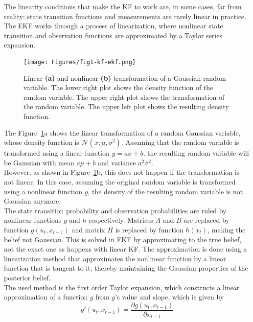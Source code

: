 The linearity conditions that make the KF to work are, in some cases, far from reality: state transition functions and measurements are rarely linear in practice. The \ac{EKF} works through a process of linearization, where nonlinear state transition and observation functions are approximated by a Taylor series expansion. \\

\begin{figure}[h]
    \centering
    \texttt{[image: Figures/fig1-kf-ekf.png]}
    \caption[Linear and nonlinear transformation of a Gaussian random variable]{Linear \textbf{(a)} and nonlinear \textbf{(b)} transformation of a Gaussian random variable. The lower right plot shows the density function of the random variable. The upper right plot shows the transformation of the random variable. The upper left plot shows the resulting density function. \cite{prob-robotics}}
    \label{fig:chapter1:kf:ekf:cmp-kf-ekf}
\end{figure}

The Figure~\ref{fig:chapter1:kf:ekf:cmp-kf-ekf}a shows the linear transformation of a random Gaussian variable, whose density function is $\mathcal{N}\left(x; \mu, \sigma^2 \right)$. Assuming that the random variable is transformed using a linear function $y = ax + b$, the resulting random variable will be Gaussian with mean $a\mu + b$ and variance $a^2 \sigma^2$.\\

However, as shown in Figure~\ref{fig:chapter1:kf:ekf:cmp-kf-ekf}b, this does not happen if the transformation is not linear. In this case, assuming the original random variable is transformed using a nonlinear function $g$, the density of the resulting random variable is not Gaussian anymore.\\

The state transition probability and observation probabilities are ruled by nonlinear functions $g$ and $h$ respectively. Matrices $A$ and $B$ are replaced by function $g\left(u_t, x_{t-1}\right)$ and matrix $H$ is replaced by function $h \left(x_t\right)$, making the belief not Gaussian. This is solved in EKF by approximating to the true belief, not the exact one as happens with linear KF. The approximation is done using a linearization method that approximates the nonlinear function by a linear function that is tangent to it, thereby maintaining the Gaussian properties of the posterior belief. \\

The used method is the first order Taylor expansion, which constructs a linear approximation of a function $g$ from $g$'s value and slope, which is given by
\begin{equation}
    g' \left(u_t, x_{t-1}\right) = \frac{\partial g\left(u_t, x_{t-1}\right)}{\partial x_{t-1}}
    \label{eq:chapter1:kf:ekf:g-derivative}
\end{equation}

